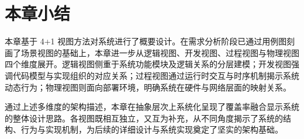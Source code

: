 \section{本章小结}
    本章基于 4+1 视图方法对系统进行了概要设计。在需求分析阶段已通过用例图刻画了场景视图的基础上，本章进一步从逻辑视图、开发视图、过程视图与物理视图四个维度展开。逻辑视图侧重于系统功能模块及逻辑关系的分层建模；开发视图强调代码模型与实现组织的对应关系；过程视图通过运行时交互与时序机制揭示系统动态行为；物理视图则面向部署环境，明确系统在硬件与网络层面的映射关系。

    通过上述多维度的架构描述，本章在抽象层次上系统化呈现了覆盖率融合显示系统的整体设计思路。各视图既相互独立，又互为补充，从不同角度揭示了系统的结构、行为与实现机制，为后续的详细设计与系统实现奠定了坚实的架构基础。